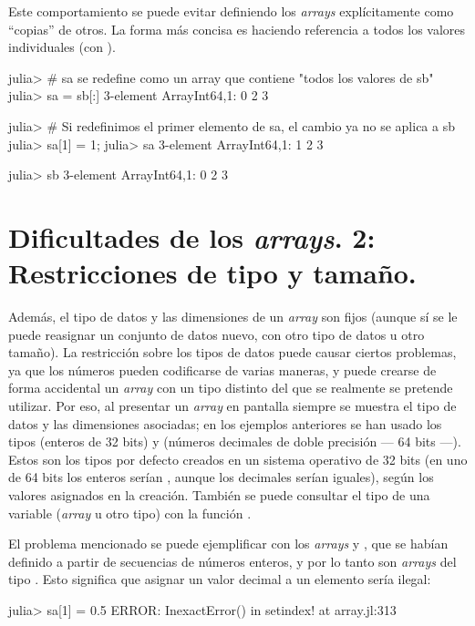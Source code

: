 Este comportamiento se puede evitar definiendo los \emph{arrays} explícitamente como ``copias'' de otros. La forma más concisa es haciendo referencia a todos los valores individuales (con \code{[:]}).

\begin{jlconcode}
julia> # sa se redefine como un array que contiene "todos los valores de sb"
julia> sa = sb[:]
3-element Array{Int64,1}:
 0
 2
 3

julia> # Si redefinimos el primer elemento de sa, el cambio ya no se aplica a sb
julia> sa[1] = 1;
julia> sa
3-element Array{Int64,1}:
 1
 2
 3

julia> sb
3-element Array{Int64,1}:
 0
 2
 3
\end{jlconcode}


\section{Dificultades de los \emph{arrays}. 2: Restricciones de tipo y tamaño.}

Además, el tipo de datos y las dimensiones de un \emph{array} son fijos (aunque sí se le puede reasignar un conjunto de datos nuevo, con otro tipo de datos u otro tamaño). La restricción sobre los tipos de datos puede causar ciertos problemas, ya que los números pueden codificarse de varias maneras, y puede crearse de forma accidental un \emph{array} con un tipo distinto del que se realmente se pretende utilizar. Por eso, al presentar un \emph{array} en pantalla siempre se muestra el tipo de datos y las dimensiones asociadas; en los ejemplos anteriores se han usado los tipos  (enteros de 32 bits) y  (números decimales de doble precisión --- 64 bits ---). Estos son los tipos por defecto creados en un sistema operativo de 32 bits (en uno de 64 bits los enteros serían , aunque los decimales serían iguales), según los valores asignados en la creación. También se puede consultar el tipo de una variable (\emph{array} u otro tipo) con la función .

El problema mencionado se puede ejemplificar con los \emph{arrays}  y , que se habían definido a partir de secuencias de números enteros, y por lo tanto son \emph{arrays} del tipo . Esto significa que asignar un valor decimal a un elemento sería ilegal:

\begin{jlconcode}
julia> sa[1] = 0.5
ERROR: InexactError()
 in setindex! at array.jl:313
\end{jlconcode}

